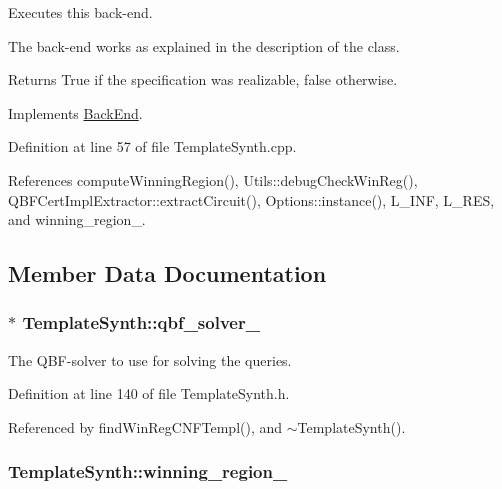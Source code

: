 Executes this back-\/end. 

The back-\/end works as explained in the description of the class.

\begin{DoxyReturn}{Returns}
True if the specification was realizable, false otherwise. 
\end{DoxyReturn}


Implements \hyperlink{classBackEnd_a099e717dc71e9cc2d838b1ca86340590}{Back\-End}.



Definition at line 57 of file Template\-Synth.\-cpp.



References compute\-Winning\-Region(), Utils\-::debug\-Check\-Win\-Reg(), Q\-B\-F\-Cert\-Impl\-Extractor\-::extract\-Circuit(), Options\-::instance(), L\-\_\-\-I\-N\-F, L\-\_\-\-R\-E\-S, and winning\-\_\-region\-\_\-.



\subsection{Member Data Documentation}
\hypertarget{classTemplateSynth_a08ec20197bf16a10546a7e6cf3719727}{
\subsubsection[{qbf\-\_\-solver\-\_\-}]{$\ast$ Template\-Synth\-::qbf\-\_\-solver\-\_\-\hspace{0.3cm}{\ttfamily [protected]}}}\label{classTemplateSynth_a08ec20197bf16a10546a7e6cf3719727}


The Q\-B\-F-\/solver to use for solving the queries. 



Definition at line 140 of file Template\-Synth.\-h.



Referenced by find\-Win\-Reg\-C\-N\-F\-Templ(), and $\sim$\-Template\-Synth().

\hypertarget{classTemplateSynth_a4e147629eae6a542dd87d72902df68c8}{
\subsubsection[{winning\-\_\-region\-\_\-}]{ Template\-Synth\-::winning\-\_\-region\-\_\-\hspace{0.3cm}{\ttfamily [protected]}}}\label{classTemplateSynth_a4e147629eae6a542dd87d72902df68c8}


